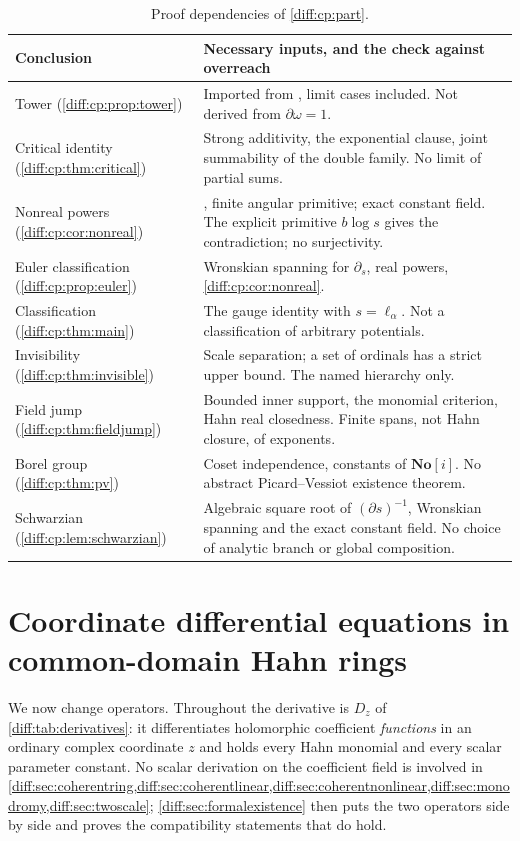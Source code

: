 \documentclass[11pt,letterpaper]{article}
\numberwithin{equation}{section}
\theoremstyle{definition}
\theoremstyle{remark}
\newcommand{\SC}{\mathbf{No}[i]}
\newcommand{\der}{\partial}
\newcommand{\Dz}{D_{z}}
\begin{document}
\begin{table}[htbp]
\centering\small
\caption{Proof dependencies of \cref{diff:cp:part}.}
\label{diff:cp:tab:dependencies}
\begin{tabularx}{\textwidth}{@{}L{0.27\textwidth}Y@{}}
\toprule
Conclusion & Necessary inputs, and the check against overreach \\
\midrule
Tower (\cref{diff:cp:prop:tower}) & Imported from \cite{ADH}, limit cases
included. Not derived from $\der\omega=1$. \\
Critical identity (\cref{diff:cp:thm:critical}) & Strong additivity, the
exponential clause, joint summability of the double family. No limit of partial
sums. \\
Nonreal powers (\cref{diff:cp:cor:nonreal}) & ,
finite angular primitive; exact constant field. The explicit
primitive $b\log s$ gives the contradiction; no surjectivity. \\
Euler classification (\cref{diff:cp:prop:euler}) & Wronskian spanning for
$\der_{s}$, real powers, \cref{diff:cp:cor:nonreal}. \\
Classification (\cref{diff:cp:thm:main}) & The gauge identity with
$s=\ell_{\alpha}$. Not a classification of arbitrary potentials. \\
Invisibility (\cref{diff:cp:thm:invisible}) & Scale separation; a set of
ordinals has a strict upper bound. The named hierarchy only. \\
Field jump (\cref{diff:cp:thm:fieldjump}) & Bounded inner support, the monomial
criterion, Hahn real closedness. Finite spans, not Hahn closure, of exponents. \\
Borel group (\cref{diff:cp:thm:pv}) & Coset independence, constants of $\SC$.
No abstract Picard--Vessiot existence theorem. \\
Schwarzian (\cref{diff:cp:lem:schwarzian}) & Algebraic square root
of $(\der s)^{-1}$, Wronskian spanning and the exact constant
field. No choice of analytic branch or global composition. \\
\bottomrule
\end{tabularx}
\end{table}

\part{Coordinate differential equations in common-domain Hahn rings}
\label{diff:part:coordinate}

We now change operators. Throughout \cref{diff:part:coordinate} the
derivative is $\Dz$ of \cref{diff:tab:derivatives}: it differentiates
holomorphic coefficient \emph{functions} in an ordinary complex coordinate
$z$ and holds every Hahn monomial and every scalar parameter constant. No
scalar derivation on the coefficient field is involved in
\cref{diff:sec:coherentring,diff:sec:coherentlinear,diff:sec:coherentnonlinear,diff:sec:monodromy,diff:sec:twoscale};
\cref{diff:sec:formalexistence} then puts the two operators side by side and
proves the compatibility statements that do hold.
\end{document}
